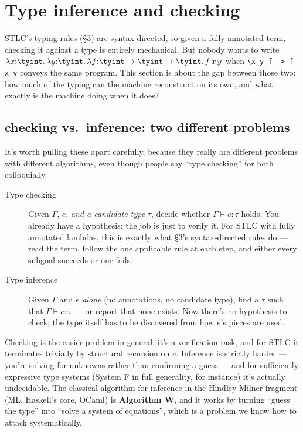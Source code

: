 \section{Type inference and checking}

STLC's typing rules (\S3) are syntax-directed, so given a fully-annotated term, checking it against a type is entirely mechanical. But nobody wants to write $\lambda x{:}\tyint.\,\lambda y{:}\tyint.\,\lambda f{:}\tyint\to\tyint\to\tyint.\,f\,x\,y$ when \lstinline|\x y f -> f x y| conveys the same program. This section is about the gap between those two: how much of the typing can the machine reconstruct on its own, and what exactly is the machine doing when it does?

\subsection{checking vs.\ inference: two different problems}

It's worth pulling these apart carefully, because they really are different problems with different algorithms, even though people say ``type checking'' for both colloquially.

\begin{description}
  \item[Type checking] Given $\Gamma$, $e$, \emph{and a candidate type} $\tau$, decide whether $\Gamma \vdash e : \tau$ holds. You already have a hypothesis; the job is just to verify it. For STLC with fully annotated lambdas, this is exactly what \S3's syntax-directed rules do — read the term, follow the one applicable rule at each step, and either every subgoal succeeds or one fails.
  \item[Type inference] Given $\Gamma$ and $e$ \emph{alone} (no annotations, no candidate type), find a $\tau$ such that $\Gamma \vdash e : \tau$ — or report that none exists. Now there's no hypothesis to check; the type itself has to be discovered from how $e$'s pieces are used.
\end{description}

Checking is the easier problem in general: it's a verification task, and for STLC it terminates trivially by structural recursion on $e$. Inference is strictly harder — you're solving for unknowns rather than confirming a guess — and for sufficiently expressive type systems (System F in full generality, for instance) it's actually undecidable. The classical algorithm for inference in the Hindley-Milner fragment (ML, Haskell's core, OCaml) is \textbf{Algorithm W}, and it works by turning ``guess the type'' into ``solve a system of equations'', which is a problem we know how to attack systematically.

